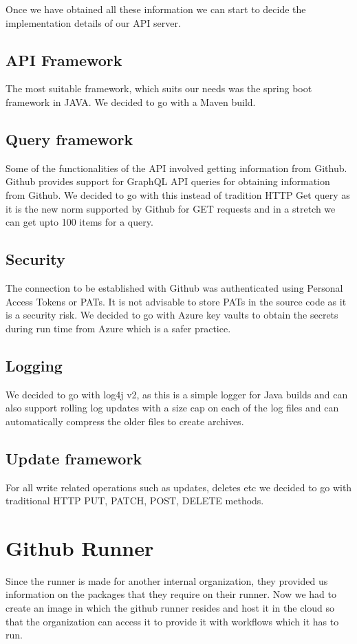 Once we have obtained all these information we can start to decide the implementation details of our API server.

\subsection{API Framework}
The most suitable framework, which suits our needs was the spring boot framework in JAVA. We decided to go with a Maven build.


\subsection{Query framework}
Some of the functionalities of the API involved getting information from Github. Github provides support for GraphQL API queries for obtaining information from Github. We decided to go with this instead of tradition HTTP Get query as it is the new norm supported by Github for GET requests and in a stretch we can get upto 100 items for a query.

\subsection{Security}
The connection to be established with Github was authenticated using Personal Access Tokens or PATs. It is not advisable to store PATs in the source code as it is a security risk. We decided to go with Azure key vaults to obtain the secrets during run time from Azure which is a safer practice.

\subsection{Logging}
We decided to go with log4j v2, as this is a simple logger for Java builds and can also support rolling log updates with a size cap on each of the log files and can automatically compress the older files to create archives.

\subsection{Update framework}
For all write related operations such as updates, deletes etc we decided to go with traditional HTTP PUT, PATCH, POST, DELETE methods.

\section{Github Runner}
Since the runner is made for another internal organization, they provided us information on the packages that they require on their runner. Now we had to create an image in which the github runner resides and host it in the cloud so that the organization can access it to provide it with workflows which it has to run.

